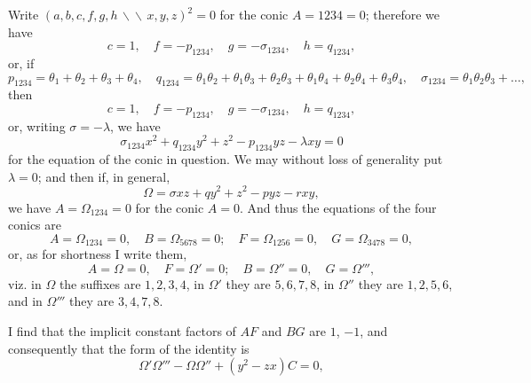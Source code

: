 \documentclass[11pt,a4paper]{article}
\theoremstyle{plain}
\begin{document}
Write $(a, b, c, f, g, h \,\backslash\!\!\backslash\, x, y, z)^2 = 0$ for the conic $A = 1234 = 0$;
therefore we have
\[
c = 1, \quad f = -p_{1234}, \quad g = -\sigma_{1234}, \quad h = q_{1234},
\]
or, if
\[
p_{1234} = \theta_1 + \theta_2 + \theta_3 + \theta_4, \quad
q_{1234} = \theta_1\theta_2 + \theta_1\theta_3 + \theta_2\theta_3 + \theta_1\theta_4 + \theta_2\theta_4 + \theta_3\theta_4, \quad
\sigma_{1234} = \theta_1\theta_2\theta_3 + \ldots,
\]
then
\[
c = 1, \quad f = -p_{1234}, \quad g = -\sigma_{1234}, \quad h = q_{1234},
\]
or, writing $\sigma = -\lambda$, we have
\[
\sigma_{1234} x^2 + q_{1234} y^2 + z^2 - p_{1234} yz - \lambda xy = 0
\]
for the equation of the conic in question. We may without loss of generality put
$\lambda = 0$; and then if, in general,
\[
\Omega = \sigma xz + q y^2 + z^2 - py z - r xy,
\]
we have $A = \Omega_{1234} = 0$ for the conic $A = 0$. And thus the equations of the four
conics are
\[
A = \Omega_{1234} = 0, \quad B = \Omega_{5678} = 0; \quad
F = \Omega_{1256} = 0, \quad G = \Omega_{3478} = 0,
\]
or, as for shortness I write them,
\[
A = \Omega = 0, \quad F = \Omega' = 0; \quad B = \Omega'' = 0, \quad G = \Omega''',
\]
viz. in $\Omega$ the suffixes are $1, 2, 3, 4$, in $\Omega'$ they are $5, 6, 7, 8$, in $\Omega''$ they are $1, 2, 5, 6$,
and in $\Omega'''$ they are $3, 4, 7, 8$.

I find that the implicit constant factors of $AF$ and $BG$ are $1$, $-1$, and consequently
that the form of the identity is
\[
\Omega'\Omega''' - \Omega\Omega'' + (y^2 - zx)C = 0,
\]
\end{document}
